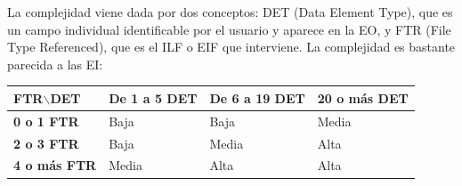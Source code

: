 \documentclass[spanish,a4paper,12pt]{report}	%
\begin{document}
	La complejidad viene dada por dos conceptos: DET (Data Element Type), que es un campo individual identificable por el usuario y aparece en la EO, y FTR (File Type Referenced), que es el ILF o EIF que interviene. La complejidad es bastante parecida a las EI: 

\vspace{0.35cm}

			\begin{tabular}{|p{3cm}||p{3cm}|p{3.2cm}|p{3cm}|}
				\hline
				\textbf{FTR$\backslash$DET} & \textbf{De 1 a 5 DET} & \textbf{De 6 a 19 DET} & \textbf{20  o más DET} \\ \hline \hline
				\textbf{0 o 1 FTR} & Baja & Baja & Media \\ \hline 
				\textbf{2 o 3 FTR} & Baja & Media & Alta \\ \hline 
				\textbf{4 o más FTR} & Media & Alta & Alta \\ \hline 
			\end{tabular}

\vspace{0.35cm}
\end{document}
